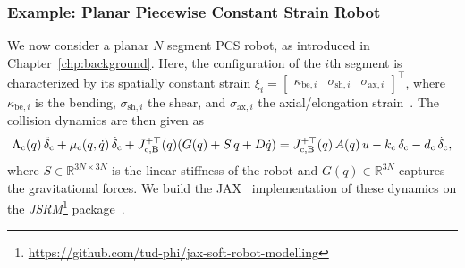 \subsubsection{Example: Planar Piecewise Constant Strain Robot}

We now consider a planar $N$ segment \gls{PCS} robot, as introduced in Chapter~\ref{chp:background}. Here, the configuration of the $i$th segment is characterized by its spatially constant strain $\xi_i = \begin{bmatrix}
    \kappa_{\mathrm{be},i} & \sigma_{\mathrm{sh},i} & \sigma_{\mathrm{ax},i}
\end{bmatrix}^\top$, where $\kappa_{\mathrm{be},i}$ is the bending, $\sigma_{\mathrm{sh},i}$ the shear, and $\sigma_{\mathrm{ax},i}$ the axial/elongation strain~\citep{renda2018discrete}.
The collision dynamics are then given as
\begin{equation}
    \Lambda_\mathrm{c}(q) \, \Ddot{\delta}_\mathrm{c} + \mu_\mathrm{c}(q,\dot{q}) \, \dot{\delta}_\mathrm{c} + J_\mathrm{c,B}^{+\top}(q) ( G(q) + S \, q + D \dot{q} ) = J_\mathrm{c,B}^{+\top}(q) \, A(q) \, u - k_\mathrm{c} \, \delta_\mathrm{c} - d_\mathrm{c} \, \dot{\delta}_\mathrm{c},
\end{equation}
where $S \in \mathbb{R}^{3N \times 3N}$ is the linear stiffness of the robot and $G(q) \in \mathbb{R}^{3N}$ captures the gravitational forces.
We build the JAX~\citep{jax2018github} implementation of these dynamics on the \emph{JSRM}\footnote{\url{https://github.com/tud-phi/jax-soft-robot-modelling}} package~\citep{stolzle2024experimental}.

